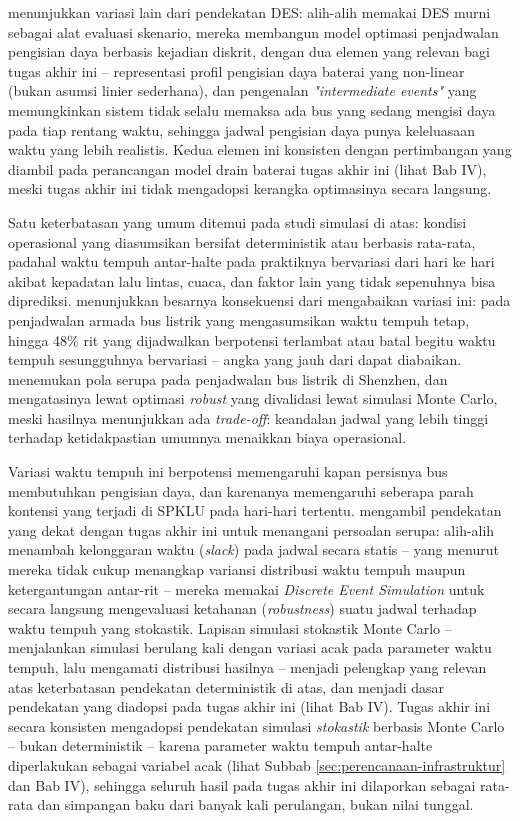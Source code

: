 \textcite{casella2024} menunjukkan variasi
lain dari pendekatan DES: alih-alih memakai DES murni sebagai alat evaluasi
skenario, mereka membangun model optimasi penjadwalan pengisian daya
berbasis kejadian diskrit, dengan dua elemen yang relevan bagi tugas akhir
ini -- representasi profil pengisian daya baterai yang non-linear
(bukan asumsi linier sederhana), dan pengenalan \textit{"intermediate
	events"} yang memungkinkan sistem tidak selalu memaksa ada bus yang
sedang mengisi daya pada tiap rentang waktu, sehingga jadwal pengisian daya
punya keleluasaan waktu yang lebih realistis. Kedua elemen ini konsisten
dengan pertimbangan yang diambil pada perancangan model drain baterai
tugas akhir ini (lihat Bab IV), meski tugas akhir ini tidak mengadopsi
kerangka optimasinya secara langsung.

Satu keterbatasan yang umum ditemui pada studi simulasi di atas: kondisi
operasional yang diasumsikan bersifat deterministik atau berbasis
rata-rata, padahal waktu tempuh antar-halte pada praktiknya bervariasi dari
hari ke hari akibat kepadatan lalu lintas, cuaca, dan faktor lain yang
tidak sepenuhnya bisa diprediksi. \textcite{avishan2023} menunjukkan besarnya konsekuensi dari mengabaikan
variasi ini: pada penjadwalan armada bus listrik yang mengasumsikan waktu
tempuh tetap, hingga 48\% rit yang dijadwalkan berpotensi terlambat atau
batal begitu waktu tempuh sesungguhnya bervariasi -- angka yang jauh dari
dapat diabaikan. \textcite{jiang2021} menemukan pola
serupa pada penjadwalan bus listrik di Shenzhen, dan mengatasinya lewat
optimasi \textit{robust} yang divalidasi lewat simulasi Monte Carlo,
meski hasilnya menunjukkan ada \textit{trade-off}: keandalan jadwal yang
lebih tinggi terhadap ketidakpastian umumnya menaikkan biaya operasional.

Variasi waktu tempuh ini berpotensi memengaruhi kapan persisnya bus
membutuhkan pengisian daya, dan karenanya memengaruhi seberapa parah
kontensi yang terjadi di SPKLU pada hari-hari tertentu. \textcite{debruin2023} mengambil
pendekatan yang dekat dengan tugas akhir ini untuk menangani persoalan
serupa: alih-alih menambah kelonggaran waktu (\textit{slack}) pada jadwal
secara statis -- yang menurut mereka tidak cukup menangkap variansi
distribusi waktu tempuh maupun ketergantungan antar-rit -- mereka memakai
\textit{Discrete Event Simulation} untuk secara langsung mengevaluasi
ketahanan (\textit{robustness}) suatu jadwal terhadap waktu tempuh yang
stokastik. Lapisan simulasi stokastik Monte Carlo -- menjalankan simulasi
berulang kali dengan variasi acak pada parameter waktu tempuh, lalu
mengamati distribusi hasilnya -- menjadi pelengkap yang relevan atas
keterbatasan pendekatan deterministik di atas, dan menjadi dasar pendekatan
yang diadopsi pada tugas akhir ini (lihat Bab IV). Tugas akhir ini secara konsisten mengadopsi pendekatan simulasi \textit{stokastik}
berbasis Monte Carlo -- bukan deterministik -- karena parameter waktu tempuh
antar-halte diperlakukan sebagai variabel acak (lihat Subbab
\ref{sec:perencanaan-infrastruktur} dan Bab IV), sehingga seluruh hasil pada
tugas akhir ini dilaporkan sebagai rata-rata dan simpangan baku dari banyak
kali perulangan, bukan nilai tunggal.

